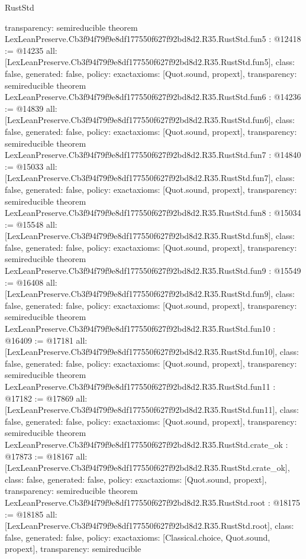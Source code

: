 \begin{lexlean}{RustStd}
\begin{coremodule}
{  transparency: semireducible
}
theorem LexLeanPreserve.Cb3f94f79f9e8df177550f627f92bd8d2.R35.RustStd.fun5 : @12418 := @14235 {
  all: [LexLeanPreserve.Cb3f94f79f9e8df177550f627f92bd8d2.R35.RustStd.fun5],
  class: false,
  generated: false,
  policy: exact{axioms: [Quot.sound, propext]},
  transparency: semireducible
}
theorem LexLeanPreserve.Cb3f94f79f9e8df177550f627f92bd8d2.R35.RustStd.fun6 : @14236 := @14839 {
  all: [LexLeanPreserve.Cb3f94f79f9e8df177550f627f92bd8d2.R35.RustStd.fun6],
  class: false,
  generated: false,
  policy: exact{axioms: [Quot.sound, propext]},
  transparency: semireducible
}
theorem LexLeanPreserve.Cb3f94f79f9e8df177550f627f92bd8d2.R35.RustStd.fun7 : @14840 := @15033 {
  all: [LexLeanPreserve.Cb3f94f79f9e8df177550f627f92bd8d2.R35.RustStd.fun7],
  class: false,
  generated: false,
  policy: exact{axioms: [Quot.sound, propext]},
  transparency: semireducible
}
theorem LexLeanPreserve.Cb3f94f79f9e8df177550f627f92bd8d2.R35.RustStd.fun8 : @15034 := @15548 {
  all: [LexLeanPreserve.Cb3f94f79f9e8df177550f627f92bd8d2.R35.RustStd.fun8],
  class: false,
  generated: false,
  policy: exact{axioms: [Quot.sound, propext]},
  transparency: semireducible
}
theorem LexLeanPreserve.Cb3f94f79f9e8df177550f627f92bd8d2.R35.RustStd.fun9 : @15549 := @16408 {
  all: [LexLeanPreserve.Cb3f94f79f9e8df177550f627f92bd8d2.R35.RustStd.fun9],
  class: false,
  generated: false,
  policy: exact{axioms: [Quot.sound, propext]},
  transparency: semireducible
}
theorem LexLeanPreserve.Cb3f94f79f9e8df177550f627f92bd8d2.R35.RustStd.fun10 : @16409 := @17181 {
  all: [LexLeanPreserve.Cb3f94f79f9e8df177550f627f92bd8d2.R35.RustStd.fun10],
  class: false,
  generated: false,
  policy: exact{axioms: [Quot.sound, propext]},
  transparency: semireducible
}
theorem LexLeanPreserve.Cb3f94f79f9e8df177550f627f92bd8d2.R35.RustStd.fun11 : @17182 := @17869 {
  all: [LexLeanPreserve.Cb3f94f79f9e8df177550f627f92bd8d2.R35.RustStd.fun11],
  class: false,
  generated: false,
  policy: exact{axioms: [Quot.sound, propext]},
  transparency: semireducible
}
theorem LexLeanPreserve.Cb3f94f79f9e8df177550f627f92bd8d2.R35.RustStd.crate_ok : @17873 := @18167 {
  all: [LexLeanPreserve.Cb3f94f79f9e8df177550f627f92bd8d2.R35.RustStd.crate_ok],
  class: false,
  generated: false,
  policy: exact{axioms: [Quot.sound, propext]},
  transparency: semireducible
}
theorem LexLeanPreserve.Cb3f94f79f9e8df177550f627f92bd8d2.R35.RustStd.root : @18175 := @18185 {
  all: [LexLeanPreserve.Cb3f94f79f9e8df177550f627f92bd8d2.R35.RustStd.root],
  class: false,
  generated: false,
  policy: exact{axioms: [Classical.choice, Quot.sound, propext]},
  transparency: semireducible
}


\end{coremodule}
\end{lexlean}
